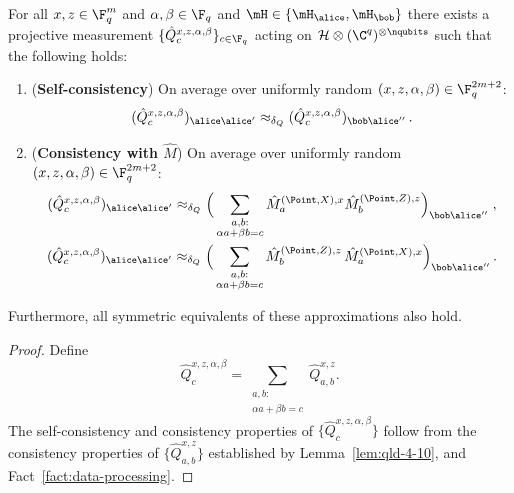 \begin{lemma}\label{lem:qld-4-12}
	For all $x,z \in \F_q^m$ and $\alpha,\beta \in \F_q$ and $\mH \in \{ \mH_\alice, \mH_\bob\}$ there exists a projective measurement $\{ \hat{Q}^{x,z,\alpha,\beta}_c \}_{c \in \F_q}$ acting on $\mathcal{H} \otimes (\C^q)^{\otimes \nqubits}$ such that the following holds:
	\begin{enumerate}
		\item (\textbf{Self-consistency}) On average over uniformly random $(x,z,\alpha,\beta) \in \F_q^{2m + 2}$:
		\begin{equation}
			\label{eq:qld-4-12-self-cons}
			(\hat{Q}^{x,z,\alpha,\beta}_{c})_{\alice \alice'} \approx_{\delta_Q}  (\hat{Q}^{x,z,\alpha,\beta}_{c})_{\bob \alice''}\,.
		\end{equation}
\item (\textbf{Consistency with $\hat{M}$}) On average over uniformly random $(x,z,\alpha,\beta) \in \F_q^{2m + 2}$:
		\begin{gather}
			\label{eq:qld-4-12-cons-m-hat}
			(\hat{Q}^{x,z,\alpha,\beta}_{c})_{\alice \alice'} \approx_{\delta_Q} \Big ( \sum_{\substack{a,b: \\ \alpha a + \beta b = c}} \hat{M}^{(\Point,X),x}_{a} \hat{M}^{(\Point,Z),z}_{b} \Big )_{\bob \alice''} \;, \\
			\label{eq:qld-4-12-cons-m-hat2}
			(\hat{Q}^{x,z,\alpha,\beta}_{c})_{\alice \alice'} \approx_{\delta_Q}  \Big ( \sum_{\substack{a,b: \\ \alpha a + \beta b = c}} \hat{M}^{(\Point,Z),z}_{b} \, \hat{M}^{(\Point,X),x}_{a}  \Big )_{\bob \alice''}  \,.			
		\end{gather}
              \end{enumerate}
                    Furthermore, all symmetric equivalents of these approximations
      also hold.
\end{lemma}
\begin{proof}
	Define 
	\[
		\hat{Q}^{x,z,\alpha,\beta}_{c} = \sum_{\substack{a,b:\\ \alpha a + \beta b = c}} \hat{Q}^{x,z}_{a,b}.
	\]
	The self-consistency and consistency properties of $\{ \hat{Q}^{x,z,\alpha,\beta}_{c} \}$ follow from the consistency properties of $\{ \hat{Q}^{x,z}_{a,b} \}$ established by Lemma~\ref{lem:qld-4-10}, and Fact~\ref{fact:data-processing}. 
\end{proof}

